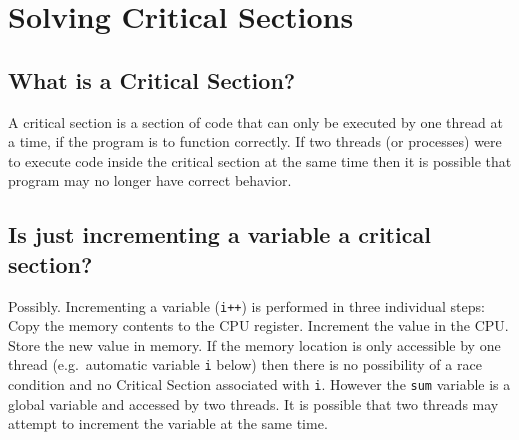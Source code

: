 \section{Solving Critical Sections}\label{solving-critical-sections}

\subsection{What is a Critical
Section?}\label{what-is-a-critical-section}

A critical section is a section of code that can only be executed by one
thread at a time, if the program is to function correctly. If two
threads (or processes) were to execute code inside the critical section
at the same time then it is possible that program may no longer have
correct behavior.

\subsection{Is just incrementing a variable a critical
section?}\label{is-just-incrementing-a-variable-a-critical-section}

Possibly. Incrementing a variable (\texttt{i++}) is performed in three
individual steps: Copy the memory contents to the CPU register.
Increment the value in the CPU. Store the new value in memory. If the
memory location is only accessible by one thread (e.g.~automatic
variable \texttt{i} below) then there is no possibility of a race
condition and no Critical Section associated with \texttt{i}. However
the \texttt{sum} variable is a global variable and accessed by two
threads. It is possible that two threads may attempt to increment the
variable at the same time.

